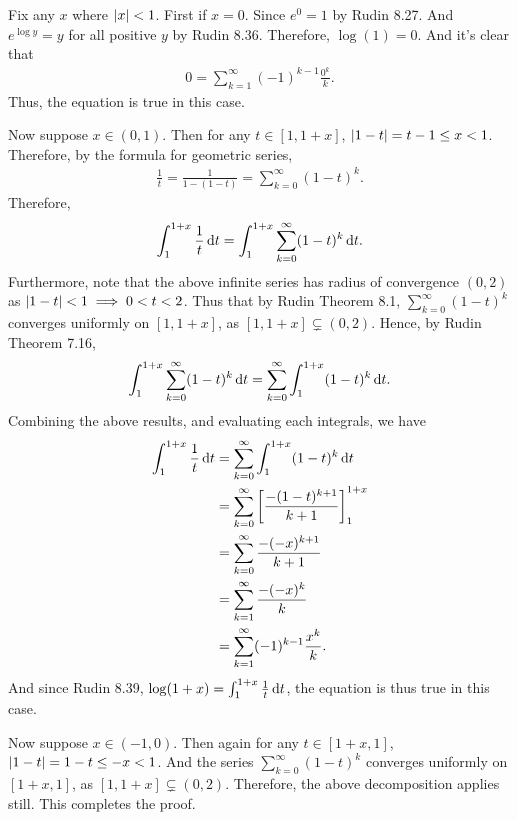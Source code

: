 \documentclass[12pt]{article}
\begin{document}
\begin{fproof}[1(a)]
 Fix any \(x\) where \(\left\lvert x \right\rvert < 1\).
 First if \(x = 0\). Since \(e^{0} = 1\) by Rudin 8.27. And \(e^{\log y} = y\) for all positive \(y\) by Rudin 8.36. Therefore, \(\log(1) = 0\).
 And it's clear that 
 \begin{align*}
     0 =\sum_{k=1}^{\infty} (-1)^{k-1} \frac{0^k}{k}.
 \end{align*}
 Thus, the equation is true in this case.

 Now suppose \(x \in (0,1)\).
 Then for any \(t \in [1, 1+x]\), \(\left\lvert 1-t \right\rvert = t-1 \leq x < 1\).
 Therefore, by the formula for geometric series,
 \begin{align*}
     \frac{1}{t} = \frac{1}{1-(1-t)} = \sum_{k=0}^{\infty} (1-t)^k.
 \end{align*}
 Therefore,
 \begin{align*}
     \int_{1}^{1+x} \frac{1}{t} \mathop{}\!\mathrm{d} t = \int_{1}^{1+x} \sum_{k=0}^{\infty} (1-t)^k \mathop{}\!\mathrm{d} t.
 \end{align*}
 Furthermore, note that the above infinite series has radius of convergence \((0,2)\)  as \(\left\lvert 1-t \right\rvert < 1 \implies 0<t<2\).
 Thus that by Rudin Theorem 8.1, \(\sum_{k=0}^{\infty} (1-t)^k\) converges uniformly  on \([1, 1 + x]\), as \([1, 1 + x] \subsetneq (0,2)\).
 Hence, by Rudin Theorem 7.16,
 \begin{align*}
     \int_{1}^{1+x} \sum_{k=0}^{\infty} (1-t)^k \mathop{}\!\mathrm{d} t = \sum_{k=0}^{\infty} \int_{1}^{1+x} (1-t)^k \mathop{}\!\mathrm{d} t. 
 \end{align*}
 Combining the above results, and evaluating each integrals, we have
 \begin{align*}
     \int_{1}^{1+x} \frac{1}{t} \mathop{}\!\mathrm{d} t &= \sum_{k=0}^{\infty} \int_{1}^{1+x} (1-t)^k \mathop{}\!\mathrm{d} t \\
     &= \sum_{k=0}^{\infty} \left[ \frac{-(1-t)^{k+1}}{k+1} \right]_{1}^{1+x} \\
     &= \sum_{k=0}^{\infty} \frac{-(-x)^{k+1}}{k+1}\\
     &=\sum_{ k=1}^{\infty} \frac{-(-x)^{k}}{k}\\
     &= \sum_{k=1}^{\infty} (-1)^{k-1}\frac{x^k}{k}.
 \end{align*}
 And since Rudin 8.39, \(\log(1+x) = \int_{1}^{1+x} \frac{1}{t} \mathop{}\!\mathrm{d} t\), the equation is  thus true in this case.

 Now suppose \(x \in (-1,0)\).
 Then again for any \(t \in [1+x, 1]\), \(\left\lvert 1-t \right\rvert = 1-t \leq -x < 1\).
 And the series \(\sum_{k=0}^{\infty} (1-t)^k\) converges uniformly on \([1+x,1]\), as  \([1, 1+x] \subsetneq (0,2)\).
 Therefore, the above decomposition applies still.
 This completes the proof.
\end{fproof}
\end{document}
